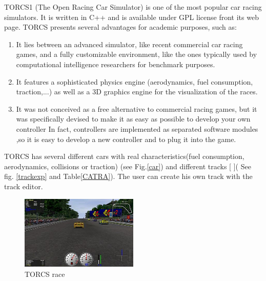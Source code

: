 \documentclass{llncs}
\begin{document}
TORCS1 (The Open Racing Car Simulator) is one of the most popular car racing simulators. It is written in C++ and
is available under GPL license front its web page. TORCS
presents several advantages for academic purposes, such as:
\begin{enumerate}
	
	\item  It lies between an advanced simulator, like recent commercial
	car racing games, and a fully customizable environment,
	like the ones typically used by computational
	intelligence researchers for benchmark purposes.
	\item  It features a sophisticated physics engine (aerodynamics,
	fuel consumption, traction,...) as well as a 3D graphics
	engine for the visualization of the races.
	\item  It was not conceived as a free alternative to commercial
	racing games, but it was specifically devised to make it
	as easy as possible to develop your own controller In fact, controllers are implemented as separated software
	modules ,so it is easy to develop a new controller and to plug
	it into the game.
	
\end{enumerate}

TORCS has several different cars with real characteristics(fuel consumption, aerodynamics, collisions or traction) (see Fig.\ref{car}) and different tracks [\cite{manuel} ]( See fig. \ref{trackexp} and Table\ref{CATRA}). The user can create his own track with the track editor.

\begin{figure}[h!]
	\centering
	\includegraphics[width=0.5\textwidth]{fig/TORCS1.PNG}
	\begin{minipage}{10cm}
		\centering
		
		\caption{\footnotesize TORCS race}
		\label{0301}
	\end{minipage} 
\end{figure}
\end{document}
